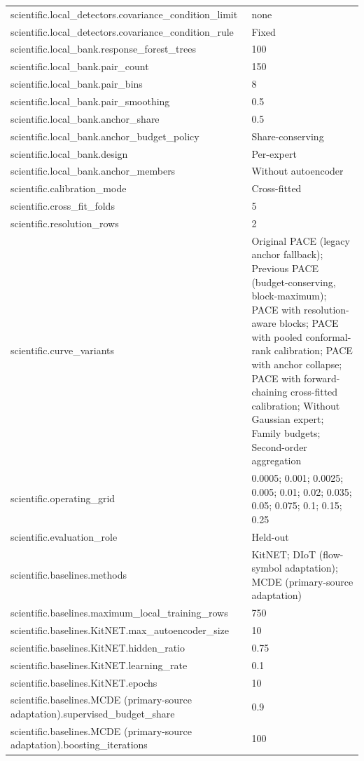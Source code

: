 \begin{tabular}{ll}
scientific.local\_detectors.covariance\_condition\_limit & none \\
scientific.local\_detectors.covariance\_condition\_rule & Fixed \\
scientific.local\_bank.response\_forest\_trees & 100 \\
scientific.local\_bank.pair\_count & 150 \\
scientific.local\_bank.pair\_bins & 8 \\
scientific.local\_bank.pair\_smoothing & 0.5 \\
scientific.local\_bank.anchor\_share & 0.5 \\
scientific.local\_bank.anchor\_budget\_policy & Share-conserving \\
scientific.local\_bank.design & Per-expert \\
scientific.local\_bank.anchor\_members & Without autoencoder \\
scientific.calibration\_mode & Cross-fitted \\
scientific.cross\_fit\_folds & 5 \\
scientific.resolution\_rows & 2 \\
scientific.curve\_variants & Original PACE (legacy anchor fallback); Previous PACE (budget-conserving, block-maximum); PACE with resolution-aware blocks; PACE with pooled conformal-rank calibration; PACE with anchor collapse; PACE with forward-chaining cross-fitted calibration; Without Gaussian expert; Family budgets; Second-order aggregation \\
scientific.operating\_grid & 0.0005; 0.001; 0.0025; 0.005; 0.01; 0.02; 0.035; 0.05; 0.075; 0.1; 0.15; 0.25 \\
scientific.evaluation\_role & Held-out \\
scientific.baselines.methods & KitNET; DIoT (flow-symbol adaptation); MCDE (primary-source adaptation) \\
scientific.baselines.maximum\_local\_training\_rows & 750 \\
scientific.baselines.KitNET.max\_autoencoder\_size & 10 \\
scientific.baselines.KitNET.hidden\_ratio & 0.75 \\
scientific.baselines.KitNET.learning\_rate & 0.1 \\
scientific.baselines.KitNET.epochs & 10 \\
scientific.baselines.MCDE (primary-source adaptation).supervised\_budget\_share & 0.9 \\
scientific.baselines.MCDE (primary-source adaptation).boosting\_iterations & 100 \\

\end{tabular}
